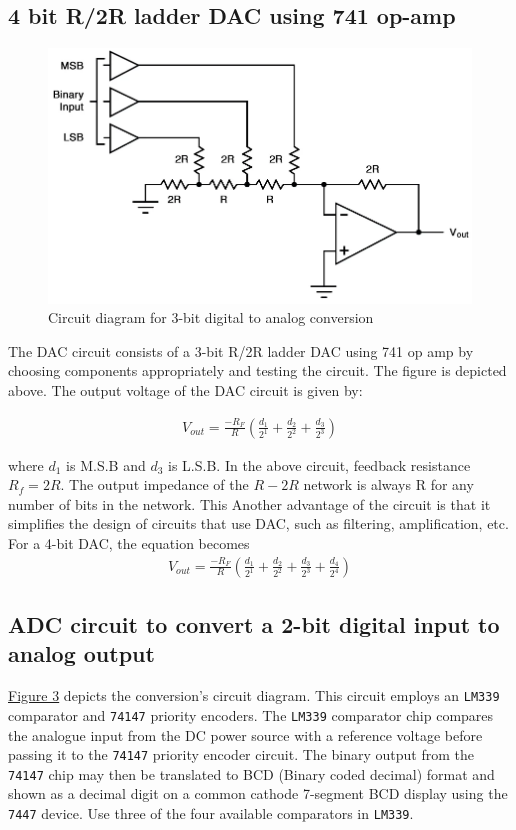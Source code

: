 \subsection{4 bit R/2R ladder DAC using 741 op-amp}
\begin{figure}[H]
    \centering
    \includegraphics[width=1\columnwidth]{images/th1.png}
    \caption{ Circuit diagram for 3-bit digital to analog conversion }
    \label{obj:1}
\end{figure}
The DAC circuit consists of a 3-bit R/2R ladder DAC using 741 op amp by choosing components appropriately and testing the circuit. The figure is depicted above. The output voltage of the DAC circuit is given by:
		
\begin{align}\label{eq1} V_{out} = \frac{-R_F}{R}\left( \frac{d_1}{2^1} + \frac{d_2}{2^2} + \frac{d_3}{2^3} \right)\end{align}

where $d_1$ is M.S.B and $d_3$ is L.S.B. In the above circuit, feedback resistance $R_f=2R$. The output impedance of the $R-2R$ network is always R for any number of bits in the network. This Another advantage of the circuit is that it simplifies the design of circuits that use DAC, such as filtering, amplification, etc. For a 4-bit DAC, the equation becomes
\begin{align}\label{eq2} V_{out} = \frac{-R_F}{R}\left( \frac{d_1}{2^1} + \frac{d_2}{2^2} + \frac{d_3}{2^3} + \frac{d_4}{2^4} \right)\end{align}

\subsection{ADC circuit to convert a 2-bit digital input to analog output}
\hyperref[obj:2]{Figure 3} depicts the conversion's circuit diagram. This circuit employs an \verb|LM339| comparator and \verb|74147| priority encoders. The \verb|LM339| comparator chip compares the analogue input from the DC power source with a reference voltage before passing it to the \verb|74147| priority encoder circuit. The binary output from the \verb|74147| chip may then be translated to BCD (Binary coded decimal) format and shown as a decimal digit on a common cathode 7-segment BCD display using the \verb|7447| device. Use three of the four available comparators in \verb|LM339|.

